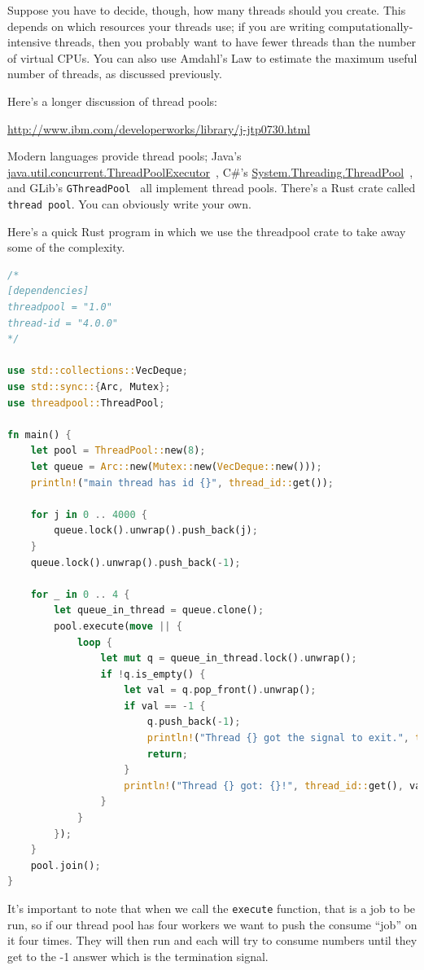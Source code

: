 \documentclass[a4paper]{report}
\begin{document}
Suppose you have to decide, though, how many threads should you create.
This depends
on which resources your threads use; if you are writing
computationally-intensive threads, then you probably want to have
fewer threads than the number of virtual CPUs. You can also use
Amdahl's Law to estimate the maximum useful number of threads, as
discussed previously.

Here's a longer discussion of thread pools:

\begin{center}
\url{http://www.ibm.com/developerworks/library/j-jtp0730.html}
\end{center}

Modern languages provide thread pools; Java's
\url{java.util.concurrent.ThreadPoolExecutor}~\cite{java:threadpoolexecutor}, C\#'s
\url{System.Threading.ThreadPool}~\cite{csharp:threadpool}, and GLib's {\tt GThreadPool}~\cite{gnome:threadpool} all implement thread pools. There's a Rust crate called \texttt{thread pool}. You can obviously write your own.

Here's a quick Rust program in which we use the threadpool crate to take away some of the complexity.
\begin{lstlisting}[language=Rust]
/*
[dependencies]
threadpool = "1.0"
thread-id = "4.0.0"
*/

use std::collections::VecDeque;
use std::sync::{Arc, Mutex};
use threadpool::ThreadPool;

fn main() {
    let pool = ThreadPool::new(8);
    let queue = Arc::new(Mutex::new(VecDeque::new()));
    println!("main thread has id {}", thread_id::get());

    for j in 0 .. 4000 {
        queue.lock().unwrap().push_back(j);
    }
    queue.lock().unwrap().push_back(-1);

    for _ in 0 .. 4 {
        let queue_in_thread = queue.clone();
        pool.execute(move || {
            loop {
                let mut q = queue_in_thread.lock().unwrap();
                if !q.is_empty() {
                    let val = q.pop_front().unwrap();
                    if val == -1 {
                        q.push_back(-1);
                        println!("Thread {} got the signal to exit.", thread_id::get());
                        return;
                    }
                    println!("Thread {} got: {}!", thread_id::get(), val);
                }
            }
        });
    }
    pool.join();
}
\end{lstlisting}

It's important to note that when we call the \texttt{execute} function, that is a job to be run, so if our thread pool has four workers we want to push the consume ``job'' on it four times. They will then run and each will try to consume numbers until they get to the -1 answer which is the termination signal.
\end{document}
